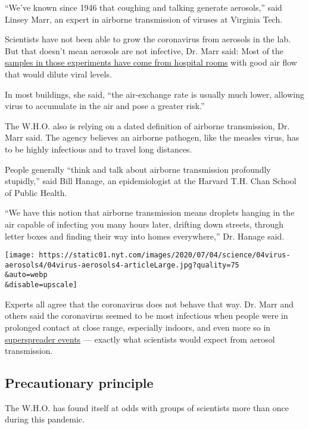``We've known since 1946 that coughing and talking generate aerosols,''
said Linsey Marr, an expert in airborne transmission of viruses at
Virginia Tech.

Scientists have not been able to grow the coronavirus from aerosols in
the lab. But that doesn't mean aerosols are not infective, Dr. Marr
said: Most of the
\href{https://www.sciencedirect.com/science/article/pii/S0013935120307143?via\%3Dihub}{samples
in those experiments have come from hospital rooms} with good air flow
that would dilute viral levels.

In most buildings, she said, ``the air-exchange rate is usually much
lower, allowing virus to accumulate in the air and pose a greater
risk.''

The W.H.O. also is relying on a dated definition of airborne
transmission, Dr. Marr said. The agency believes an airborne pathogen,
like the measles virus, has to be highly infectious and to travel long
distances.

People generally ``think and talk about airborne transmission profoundly
stupidly,'' said Bill Hanage, an epidemiologist at the Harvard T.H. Chan
School of Public Health.

``We have this notion that airborne transmission means droplets hanging
in the air capable of infecting you many hours later, drifting down
streets, through letter boxes and finding their way into homes
everywhere,'' Dr. Hanage said.

\texttt{[image: https://static01.nyt.com/images/2020/07/04/science/04virus-aerosols4/04virus-aerosols4-articleLarge.jpg?quality=75\\\&auto=webp\\\&disable=upscale]}

Experts all agree that the coronavirus does not behave that way. Dr.
Marr and others said the coronavirus seemed to be most infectious when
people were in prolonged contact at close range, especially indoors, and
even more so in
\href{https://www.nytimes.com/2020/06/30/science/how-coronavirus-spreads.html}{superspreader
events} --- exactly what scientists would expect from aerosol
transmission.

\hypertarget{precautionary-principle}{%
\subsection{Precautionary principle}\label{precautionary-principle}}

The W.H.O. has found itself at odds with groups of scientists more than
once during this pandemic.

